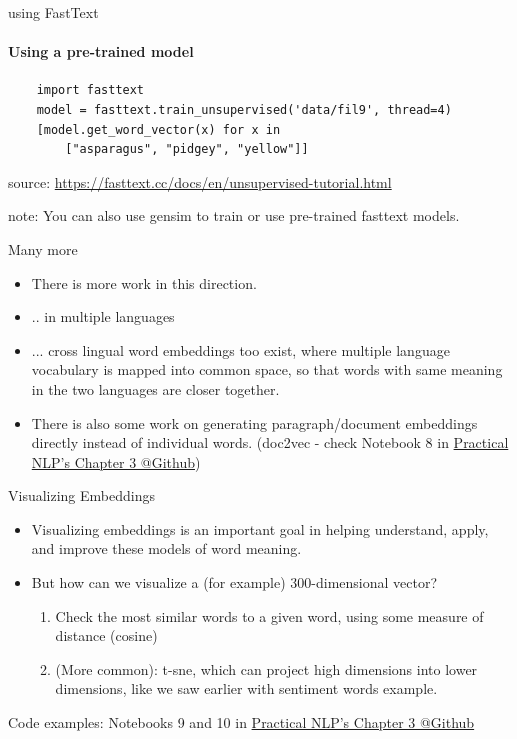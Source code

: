 \documentclass{beamer}
\begin{document}
\begin{frame}[fragile]{using FastText}
\framesubtitle{Using a pre-trained model}
\small
\begin{verbatim}
    import fasttext
    model = fasttext.train_unsupervised('data/fil9', thread=4)
    [model.get_word_vector(x) for x in 
        ["asparagus", "pidgey", "yellow"]]
\end{verbatim}
source: \url{https://fasttext.cc/docs/en/unsupervised-tutorial.html}

note: You can also use gensim to train or use pre-trained fasttext models. 
\end{frame}

\begin{frame}{Many more}
    \begin{itemize}
        \item There is more work in this direction.
        \item .. in multiple languages
        \item ... cross lingual word embeddings too exist, where multiple language vocabulary is mapped into common space, so that words with same meaning in the two languages are closer together.
        \item There is also some work on generating paragraph/document embeddings directly instead of individual words. (doc2vec - check Notebook 8 in \href{https://github.com/practical-nlp/practical-nlp/tree/master/Ch3}{Practical NLP's Chapter 3 @Github})
    \end{itemize}
\end{frame}

\begin{frame}{Visualizing Embeddings}
\begin{itemize}
    \item Visualizing embeddings is an important goal in helping understand, apply, and
improve these models of word meaning.
\item But how can we visualize a (for example) 300-dimensional vector? \pause
\begin{enumerate}
    \item Check the most similar words to a given word, using some measure of distance (cosine)
    \item (More common): t-sne, which can project high dimensions into lower dimensions, like we saw earlier with sentiment words example. 
\end{enumerate}
\end{itemize}
Code examples: Notebooks 9 and 10 in \href{https://github.com/practical-nlp/practical-nlp/tree/master/Ch3}{Practical NLP's Chapter 3 @Github}
\end{frame}
\end{document}

